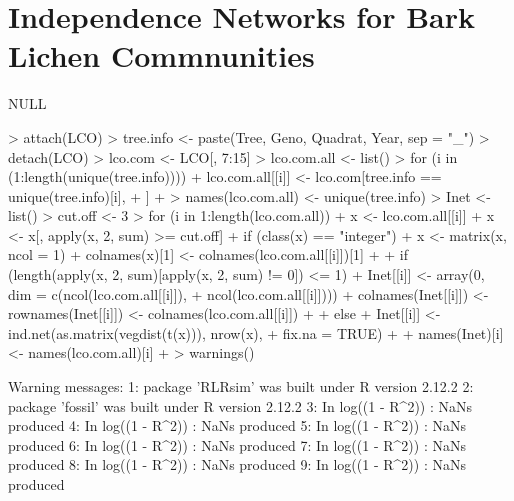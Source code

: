 \documentclass[12pt]{article}
\title{}
\author{}
\begin{document}
\maketitle


\setcounter{tocdepth}{3}
\tableofcontents

\section{Independence Networks for Bark Lichen Commnunities}


\begin{Schunk}
\begin{Soutput}
NULL
\end{Soutput}
\begin{Sinput}
> attach(LCO)
> tree.info <- paste(Tree, Geno, Quadrat, Year, sep = "_")
> detach(LCO)
> lco.com <- LCO[, 7:15]
> lco.com.all <- list()
> for (i in (1:length(unique(tree.info)))) {
+     lco.com.all[[i]] <- lco.com[tree.info == unique(tree.info)[i], 
+         ]
+ }
> names(lco.com.all) <- unique(tree.info)
> Inet <- list()
> cut.off <- 3
> for (i in 1:length(lco.com.all)) {
+     x <- lco.com.all[[i]]
+     x <- x[, apply(x, 2, sum) >= cut.off]
+     if (class(x) == "integer") {
+         x <- matrix(x, ncol = 1)
+         colnames(x)[1] <- colnames(lco.com.all[[i]])[1]
+     }
+     if (length(apply(x, 2, sum)[apply(x, 2, sum) != 0]) <= 1) {
+         Inet[[i]] <- array(0, dim = c(ncol(lco.com.all[[i]]), 
+             ncol(lco.com.all[[i]])))
+         colnames(Inet[[i]]) <- rownames(Inet[[i]]) <- colnames(lco.com.all[[i]])
+     }
+     else {
+         Inet[[i]] <- ind.net(as.matrix(vegdist(t(x))), nrow(x), 
+             fix.na = TRUE)
+     }
+     names(Inet)[i] <- names(lco.com.all)[i]
+ }
> warnings()
\end{Sinput}
\begin{Soutput}
Warning messages:
1: package 'RLRsim' was built under R version 2.12.2
2: package 'fossil' was built under R version 2.12.2
3: In log((1 - R^2)) : NaNs produced
4: In log((1 - R^2)) : NaNs produced
5: In log((1 - R^2)) : NaNs produced
6: In log((1 - R^2)) : NaNs produced
7: In log((1 - R^2)) : NaNs produced
8: In log((1 - R^2)) : NaNs produced
9: In log((1 - R^2)) : NaNs produced

\end{Soutput}
\end{Schunk}
\end{document}
